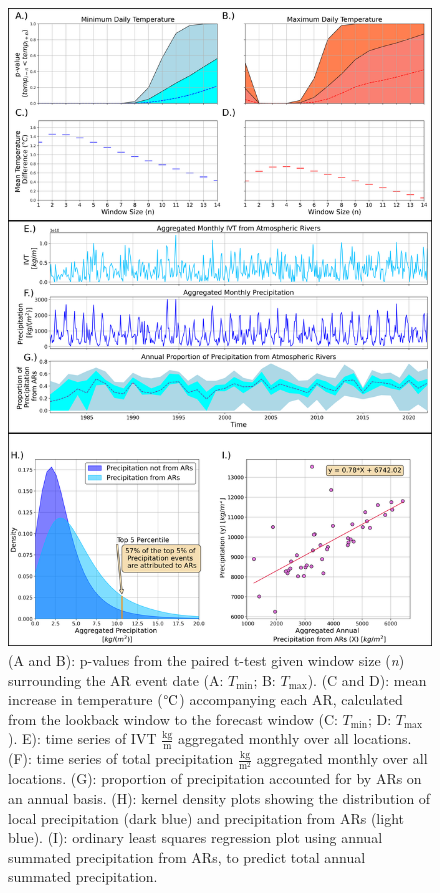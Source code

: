 \documentclass[12pts,draft]{AR_analysis_}
\begin{document}
\begin{figure}[H]
\centering
\includegraphics[width=1.0\textwidth]{./images/large.png}
\caption{(A and B): p-values from the paired t-test given
	window size (\emph{n}) surrounding the AR event date (A:
	$T_{\text{min}}$; B: $T_{\text{max}}$). (C and D): mean increase
	in temperature ($\mathrm{\degree C}$) accompanying each AR, 
	calculated from the lookback 
	window to the forecast window (C: $T_{\text{min}}$; D: $T_{\text{max}}$).
	E): time series of IVT $\mathrm{\frac{kg}{m}}$ aggregated monthly 
	over all locations.
	(F): time series of total precipitation $\mathrm{\frac{kg}{m^{2}}}$ 
	aggregated monthly over all
	locations. (G): proportion of precipitation accounted for by
	ARs on an annual basis. (H): kernel density plots showing the distribution of
	local precipitation (dark blue) and precipitation from ARs
	(light blue). (I): ordinary least squares regression plot
	using annual summated precipitation from ARs, to predict total annual
	summated precipitation.}
	
	
\label{fig:large} 
\end{figure}
\end{document}
